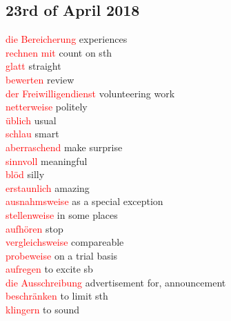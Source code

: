 \documentclass{article}
\begin{document}
\begin{multicols}{2}
	\section*{23rd of April 2018}
	\textcolor{red}{die Bereicherung} experiences\\
	\textcolor{red}{rechnen mit} count on sth\\
	\textcolor{red}{glatt} straight\\
	\textcolor{red}{bewerten} review\\
	\textcolor{red}{der Freiwilligendienst} volunteering work\\
	\textcolor{red}{netterweise} politely\\
	\textcolor{red}{üblich} usual\\
	\textcolor{red}{schlau} smart\\ 
	\textcolor{red}{aberraschend} make surprise\\ 
	\textcolor{red}{sinnvoll} meaningful\\
	\textcolor{red}{blöd} silly \\ 
	\textcolor{red}{erstaunlich} amazing\\ 
	\textcolor{red}{ausnahmsweise} as a special exception\\
	\textcolor{red}{stellenweise} in some places \\ 
	\textcolor{red}{aufhören} stop\\
	\textcolor{red}{vergleichsweise} compareable\\
	\textcolor{red}{probeweise} on a trial basis\\
	\textcolor{red}{aufregen} to excite sb\\
	\textcolor{red}{die Ausschreibung} advertisement for, announcement\\
	\textcolor{red}{beschränken} to limit sth\\
	\textcolor{red}{klingern} to sound\\
	

\end{multicols}
\end{document}
